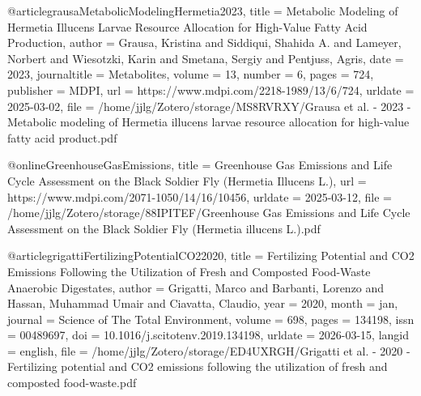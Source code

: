 {{{@article{grausaMetabolicModelingHermetia2023,
  title = {Metabolic Modeling of {{Hermetia}} Illucens Larvae Resource Allocation for High-Value Fatty Acid Production},
  author = {Grausa, Kristina and Siddiqui, Shahida A. and Lameyer, Norbert and Wiesotzki, Karin and Smetana, Sergiy and Pentjuss, Agris},
  date = {2023},
  journaltitle = {Metabolites},
  volume = {13},
  number = {6},
  pages = {724},
  publisher = {MDPI},
  url = {https://www.mdpi.com/2218-1989/13/6/724},
  urldate = {2025-03-02},
  file = {/home/jjlg/Zotero/storage/MS8RVRXY/Grausa et al. - 2023 - Metabolic modeling of Hermetia illucens larvae resource allocation for high-value fatty acid product.pdf}
}

@online{GreenhouseGasEmissions,
  title = {Greenhouse {{Gas Emissions}} and {{Life Cycle Assessment}} on the {{Black Soldier Fly}} ({{Hermetia}} Illucens {{L}}.)},
  url = {https://www.mdpi.com/2071-1050/14/16/10456},
  urldate = {2025-03-12},
  file = {/home/jjlg/Zotero/storage/88IPITEF/Greenhouse Gas Emissions and Life Cycle Assessment on the Black Soldier Fly (Hermetia illucens L.).pdf}
}

@article{grigattiFertilizingPotentialCO22020,
  title = {Fertilizing Potential and {{CO2}} Emissions Following the Utilization of Fresh and Composted Food-Waste Anaerobic Digestates},
  author = {Grigatti, Marco and Barbanti, Lorenzo and Hassan, Muhammad Umair and Ciavatta, Claudio},
  year = 2020,
  month = jan,
  journal = {Science of The Total Environment},
  volume = {698},
  pages = {134198},
  issn = {00489697},
  doi = {10.1016/j.scitotenv.2019.134198},
  urldate = {2026-03-15},
  langid = {english},
  file = {/home/jjlg/Zotero/storage/ED4UXRGH/Grigatti et al. - 2020 - Fertilizing potential and CO2 emissions following the utilization of fresh and composted food-waste.pdf}
}

}}}
